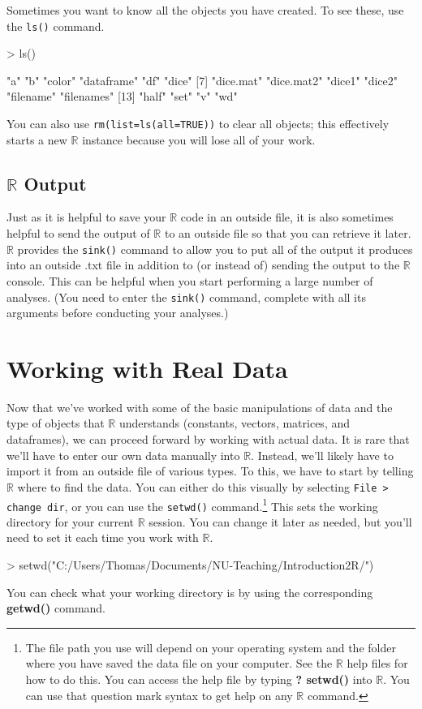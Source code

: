 \documentclass[12pt]{article}
\begin{document}
Sometimes you want to know all the objects you have created. To see these, use the \verb|ls()| command.
\begin{Schunk}
\begin{Sinput}
> ls()
\end{Sinput}
\begin{Soutput}
 [1] "a"         "b"         "color"     "dataframe" "df"        "dice"     
 [7] "dice.mat"  "dice.mat2" "dice1"     "dice2"     "filename"  "filenames"
[13] "half"      "set"       "v"         "wd"       
\end{Soutput}
\end{Schunk}
You can also use \verb|rm(list=ls(all=TRUE))| to clear all objects; this effectively starts a new $\mathbb{R}$ instance because you will lose all of your work.

\subsection{$\mathbb{R}$ Output}
Just as it is helpful to save your $\mathbb{R}$ code in an outside file, it is also sometimes helpful to send the output of $\mathbb{R}$ to an outside file so that you can retrieve it later. $\mathbb{R}$ provides the \verb|sink()| command to allow you to put all of the output it produces into an outside .txt file in addition to (or instead of) sending the output to the $\mathbb{R}$ console. This can be helpful when you start performing a large number of analyses. (You need to enter the \verb|sink()| command, complete with all its arguments before conducting your analyses.)

\section{Working with Real Data}\label{sec:data}
Now that we've worked with some of the basic manipulations of data and the type of objects that $\mathbb{R}$ understands (constants, vectors, matrices, and dataframes), we can proceed forward by working with actual data. It is rare that we'll have to enter our own data manually into $\mathbb{R}$. Instead, we'll likely have to import it from an outside file of various types. To this, we have to start by telling $\mathbb{R}$ where to find the data. You can either do this visually by selecting \verb|File > change dir|, or you can use the \verb|setwd()| command.\footnote{The file path you use will depend on your operating system and the folder where you have saved the data file on your computer. See the $\mathbb{R}$ help files for how to do this. You can access the help file by typing \textbf{? setwd()} into $\mathbb{R}$. You can use that question mark syntax to get help on any $\mathbb{R}$ command.} This sets the working directory for your current $\mathbb{R}$ session. You can change it later as needed, but you'll need to set it each time you work with $\mathbb{R}$.
\begin{Schunk}
\begin{Sinput}
> setwd("C:/Users/Thomas/Documents/NU-Teaching/Introduction2R/")
\end{Sinput}
\end{Schunk}
You can check what your working directory is by using the corresponding \textbf{getwd()} command.
\end{document}
